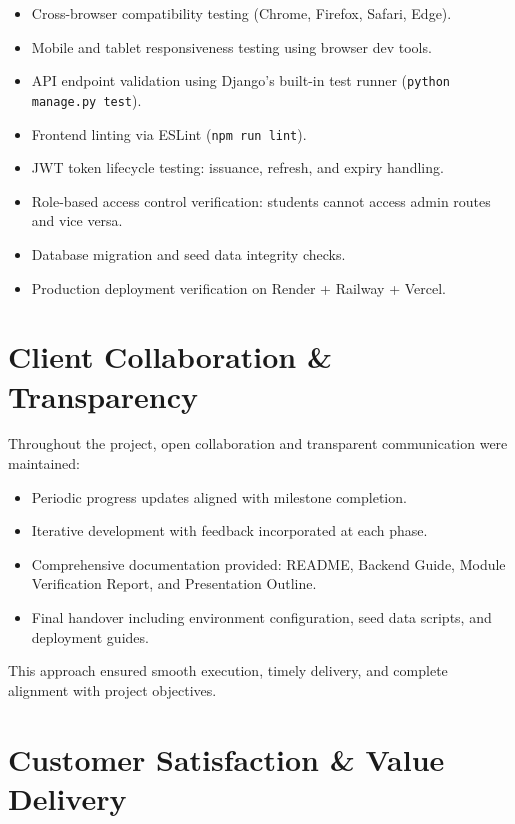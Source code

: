 \documentclass[12pt,a4paper]{article}
\begin{document}
\begin{itemize}[leftmargin=1.5em]
  \item Cross-browser compatibility testing (Chrome, Firefox, Safari, Edge).
  \item Mobile and tablet responsiveness testing using browser dev tools.
  \item API endpoint validation using Django's built-in test runner (\texttt{python manage.py test}).
  \item Frontend linting via ESLint (\texttt{npm run lint}).
  \item JWT token lifecycle testing: issuance, refresh, and expiry handling.
  \item Role-based access control verification: students cannot access admin routes and vice versa.
  \item Database migration and seed data integrity checks.
  \item Production deployment verification on Render + Railway + Vercel.
\end{itemize}

\section{Client Collaboration \& Transparency}

Throughout the project, open collaboration and transparent communication were maintained:

\begin{itemize}[leftmargin=1.5em]
  \item Periodic progress updates aligned with milestone completion.
  \item Iterative development with feedback incorporated at each phase.
  \item Comprehensive documentation provided: README, Backend Guide, Module Verification Report, and Presentation Outline.
  \item Final handover including environment configuration, seed data scripts, and deployment guides.
\end{itemize}

\begin{notebox}
This approach ensured smooth execution, timely delivery, and complete alignment with project objectives.
\end{notebox}

\section{Customer Satisfaction \& Value Delivery}
\end{document}
